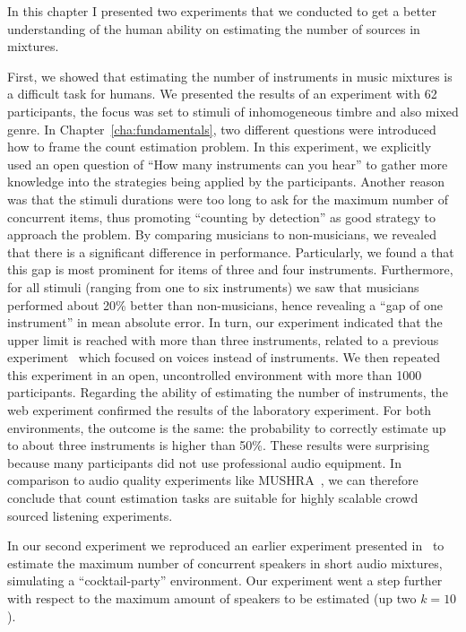 In this chapter I presented two experiments that we conducted to get a better understanding of the human ability on estimating the number of sources in mixtures.
\par
First, we showed that estimating the number of instruments in music mixtures is a difficult task for humans.
We presented the results of an experiment with 62 participants, the focus was set to stimuli of inhomogeneous timbre and also mixed genre. 
In Chapter~\ref{cha:fundamentals}, two different questions were introduced how to frame the count estimation problem. 
In this experiment, we explicitly used an open question of ``How many instruments can you hear'' to gather more knowledge into the strategies being applied by the participants.
Another reason was that the stimuli durations were too long to ask for the maximum number of concurrent items, thus promoting ``counting by detection'' as good strategy to approach the problem.
By comparing musicians to non-musicians, we revealed that there is a significant difference in performance. 
Particularly, we found a that this gap is most prominent for items of three and four instruments. 
Furthermore, for all stimuli (ranging from one to six instruments) we saw that musicians performed about 20\% better than non-musicians, hence revealing a ``gap of one instrument'' in mean absolute error.
In turn, our experiment indicated that the upper limit is reached with more than three instruments, related to a previous experiment~\cite{huron89} which focused on voices instead of instruments.
We then repeated this experiment in an open, uncontrolled environment with more than 1000 participants.
Regarding the ability of estimating the number of instruments, the web experiment confirmed the results of the laboratory experiment. 
For both environments, the outcome is the same: the probability to correctly estimate up to about three instruments is higher than 50\%.
These results were surprising because many participants did not use professional audio equipment.
In comparison to audio quality experiments like MUSHRA~\cite{recommendation2001MUSHRA}, we can therefore conclude that count estimation tasks are suitable for highly scalable crowd sourced listening experiments.
\par
In our second experiment we reproduced an earlier experiment presented in~\cite{kawashima15} to estimate the maximum number of concurrent speakers in short audio mixtures, simulating a ``cocktail-party'' environment.
Our experiment went a step further with respect to the maximum amount of speakers to be estimated (up two \(k=10\)).

